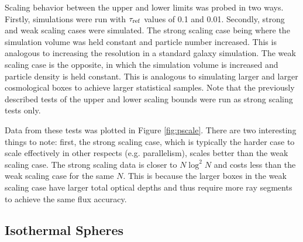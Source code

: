 \documentclass[fleq,usenatbib]{mnras}
\newcommand{\tr}{\tau_{\rm ref}}
\begin{document}
{Scaling behavior between the upper and lower limits was probed in two ways. 
Firstly, simulations were run with $\tr$ values of 0.1 and 0.01. Secondly, 
strong and weak scaling cases were simulated. The strong scaling case being 
where the simulation volume was held constant and particle number increased. 
This is analogous to increasing the resolution in a standard galaxy 
simulation. The weak scaling case is the opposite, in which the simulation 
volume is increased and particle density is held constant. This is analogous 
to simulating larger and larger cosmological boxes to achieve larger 
statistical samples. Note that the previously described tests of the upper and 
lower scaling bounds were run as strong scaling tests only.

Data from these tests was plotted in Figure \ref{fig:pscale}. 
There are two interesting things to note: first, the strong scaling case, 
which is typically the harder case to scale effectively in other respects (e.g. parallelism),
scales better than 
the weak scaling case.  The strong scaling data is closer to
$N\log^2{N}$ and costs less than the weak scaling case for the same $N$. This is 
because the larger boxes in the weak scaling case have larger total
optical depths and thus require more ray segments to achieve the same flux accuracy.

\subsection{Isothermal Spheres}\label{spheretest}
}
\end{document}
